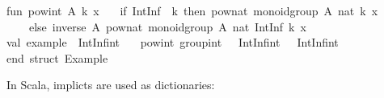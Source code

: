 \begin{isabellebody}
\begin{isamarkuptext}
\isanewline
fun\ pow{}int\ A{}\ k\ x\ {}\isanewline
\ \ {}if\ IntInf{}{}{}\ {}{}{}\ k{}\ then\ pow{}nat\ {}monoid{}group\ A{}{}\ {}nat\ k{}\ x\isanewline
\ \ \ \ else\ inverse\ A{}\ {}pow{}nat\ {}monoid{}group\ A{}{}\ {}nat\ {}IntInf{}{}\ k{}{}\ x{}{}{}\isanewline
\isanewline
val\ example\ {}\ IntInf{}int\ {}\isanewline
\ \ pow{}int\ group{}int\ {}{}{}\ {}\ IntInf{}int{}\ {}{}{}\ {}\ IntInf{}int{}{}\isanewline
\isanewline
end{}\ {}{}struct\ Example{}{}\isanewline%
\end{isamarkuptext}%
\isamarkuptrue%
%
\endisatagquotetypewriter
{\isafoldquotetypewriter}%
%
\isadelimquotetypewriter
%
\endisadelimquotetypewriter
%
\begin{isamarkuptext}%
\noindent In Scala, implicts are used as dictionaries:%
\end{isamarkuptext}%

\end{isabellebody}
